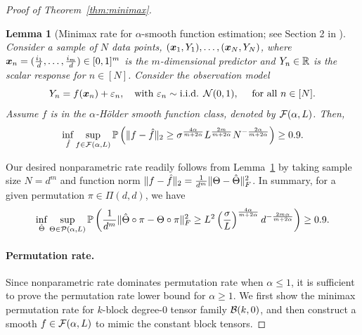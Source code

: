 \documentclass[12pt]{article}
\newtheorem{lem}{Lemma}
\theoremstyle{definition}
\begin{document}
\begin{proof}[Proof of Theorem~\ref{thm:minimax}]
\begin{lem}[Minimax rate for $\alpha$-smooth function estimation; see Section 2 in \citet{stone1982optimal}]\label{lem:non} Consider a sample of $N$ data points, $(\bm x_1,Y_1), \ldots, (\bm x_N,Y_N)$, where $\bm x_n=({i_1\over d},\ldots,{i_m\over d})\in[0,1]^m$ is the $m$-dimensional predictor and $Y_n\in\mathbb{R}$ is the scalar response for $n\in[N]$. Consider the observation model
\[
Y_n=f(\mx_n)+\varepsilon_n,\quad \text{with}\ \varepsilon_n \sim \text{i.i.d. }  \tN(0,1), \quad\text{ for all }n\in[N].
\]
Assume $f$ is in the $\alpha$-H\"older smooth function class, denoted by $\mathcal{F}(\alpha,L)$. Then,
\begin{equation}
\inf_{\hat f}\sup_{f\in \mathcal{F}(\alpha,L)}\mathbb{P}\left(\lVert f-\hat f\rVert_2\geq \sigma^{4\alpha\over m+2\alpha}L^{2m\over m+2\alpha} N^{-{2\alpha\over m+2\alpha}}\right)\geq 0.9.
\end{equation}
\end{lem}
Our desired nonparametric rate readily follows from Lemma~\ref{lem:non} by taking sample size $N=d^m$ and function norm $\lVert f-\hat f\rVert_2={1\over d^m}\lVert\Theta-\hat \Theta\rVert_F^2$. In summary, for a given permutation $\pi\in\Pi(d,d)$, we have
\begin{align}\label{eq:non}
\inf_{\hat \Theta}\sup_{\Theta\in \mathcal{P}(\alpha,L)}\mathbb{P}\left({1\over d^m}\lVert\hat \Theta\circ \pi-\Theta\circ \pi\rVert_F^2\geq L^2\left(\sigma\over L\right)^{4\alpha\over m+2\alpha} d^{-{2m\alpha\over m+2\alpha}}\right) \geq 0.9.
\end{align}



\paragraph{Permutation rate.}
Since nonparametric rate dominates permutation rate when $\alpha\leq 1$, it is sufficient to prove the permutation rate lower bound for $\alpha\geq 1.$
We first show the minimax permutation rate for $k$-block degree-$0$ tensor family $\mathcal{B}(k,0)$, and then construct a smooth $f\in\mathcal{F}(\alpha,L)$ to mimic the constant block tensors. 


\end{proof}
\end{document}
